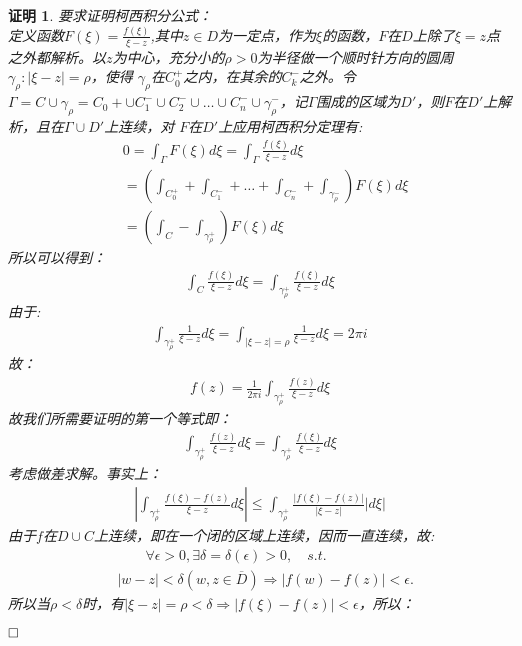 \documentclass{ctexart}
\newcommand{\。}{．} %
\newenvironment{lanse}{
    \begin{tcolorbox}[breakable,enhanced, colback=qlan, boxrule=0pt, frame hidden,
        borderline west={0.7mm}{0.1mm}{slan}]
    }
    {\end{tcolorbox}}
\theoremstyle{t} %
\newtheorem*{zmhj}{\color{slan} 证明}
\newenvironment{zm}{\begin{lanse}\begin{zmhj}}{$\hfill \square$\end{zmhj}\end{lanse}}
\begin{document}
\begin{zm}
    要求证明柯西积分公式：\\
    定义函数$F(\xi)=\frac{f(\xi)}{\xi-z}$,其中$z\in D$为一定点，作为$\xi$的函数，$F$在$D$上除了$\xi=z$点之外都解析。以$z$为中心，充分小的$\rho>0$为半径做一个顺时针方向的圆周$\gamma_\rho:|\xi-z|=\rho$，使得
    $\gamma_\rho$在$C_0^+$之内，在其余的$C_k^-$之外。令$\Gamma=C\cup \gamma_\rho=C_0+\cup C_1^-\cup C_2^-\cup \dots \cup C_n^-\cup \gamma_\rho^-$，记$\Gamma$围成的区域为$D'$，则$F$在$D'$上解析，且在$\Gamma\cup D'$上连续，对
    $F$在$D'$上应用柯西积分定理有:
    \begin{align*}
        &0=\int_{\Gamma}^{}F(\xi)d\xi=\int_{\Gamma}^{}\frac{f(\xi)}{\xi-z}d\xi\\
        &=\left(\int_{C_0^+}+\int_{C_1^-}+\dots +\int_{C_n^-}+\int_{\gamma_\rho^-}\right)F(\xi)d\xi\\
        &=\left(\int_{C}-\int_{\gamma_\rho^+}\right)F(\xi)d\xi
    \end{align*}
    所以可以得到：
    \begin{align*}
        \int_{C}\frac{f(\xi)}{\xi-z}d\xi=\int_{\gamma_\rho^+}\frac{f(\xi)}{\xi-z}d\xi
    \end{align*}
    由于:
    \begin{align*}
        \int_{\gamma_\rho^+}\frac{1}{\xi-z}d\xi=\int_{|\xi-z|=\rho}\frac{1}{\xi-z}d\xi=2\pi i
    \end{align*}
    故：
    \begin{align*}
        f(z)=\frac{1}{2\pi i}\int_{\gamma_\rho^+}\frac{f(z)}{\xi-z}d\xi
    \end{align*}
    故我们所需要证明的第一个等式即：
    \begin{align*}
        \int_{\gamma_\rho^+}\frac{f(z)}{\xi-z}d\xi=\int_{\gamma_\rho^+}\frac{f(\xi)}{\xi-z}d\xi
    \end{align*}
    考虑做差求解。事实上：
    \begin{align*}
        \left|\int_{\gamma_\rho^+}\frac{f(\xi)-f(z)}{\xi-z}d\xi\right|\le \int_{\gamma_\rho^+}\frac{|f(\xi)-f(z)|}{|\xi-z|}|d\xi|
    \end{align*}
    由于$f$在$D\cup C$上连续，即在一个闭的区域上连续，因而一直连续，故:
    \begin{align*}
        &\qquad \forall \epsilon>0, \exists \delta=\delta(\epsilon)>0,\quad s.t.\\
        &|w-z|<\delta (w,z\in\overline{D})\Rightarrow \left|f(w)-f(z)\right|<\epsilon.
    \end{align*}
    所以当$\rho<\delta$时，有$|\xi-z|=\rho<\delta\Rightarrow |f(\xi)-f(z)|<\epsilon$，所以：

\end{zm}
\end{document}
